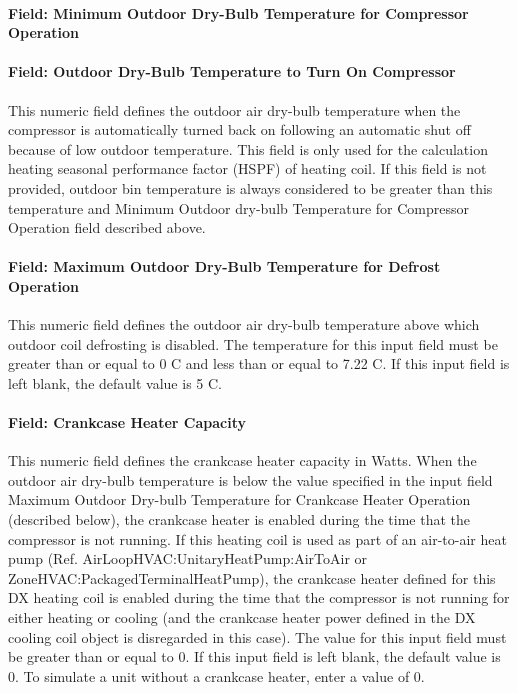 \paragraph{Field: Minimum Outdoor Dry-Bulb Temperature for Compressor Operation}\label{field-minimum-outdoor-dry-bulb-temperature-for-compressor-operation}


\paragraph{Field: Outdoor Dry-Bulb Temperature to Turn On Compressor}\label{field-outdoor-dry-bulb-temperature-to-turn-on-compressor}

This numeric field defines the outdoor air dry-bulb temperature when the compressor is automatically turned back on following an automatic shut off because of low outdoor temperature. This field is only used for the calculation heating seasonal performance factor (HSPF) of heating coil. If this field is not provided, outdoor bin temperature is always considered to be greater than this temperature and Minimum Outdoor dry-bulb Temperature for Compressor Operation field described above.

\paragraph{Field: Maximum Outdoor Dry-Bulb Temperature for Defrost Operation}\label{field-maximum-outdoor-dry-bulb-temperature-for-defrost-operation}

This numeric field defines the outdoor air dry-bulb temperature above which outdoor coil defrosting is disabled. The temperature for this input field must be greater than or equal to 0 C and less than or equal to 7.22 C. If this input field is left blank, the default value is 5 C.

\paragraph{Field: Crankcase Heater Capacity}\label{field-crankcase-heater-capacity-4}

This numeric field defines the crankcase heater capacity in Watts. When the outdoor air dry-bulb temperature is below the value specified in the input field Maximum Outdoor Dry-bulb Temperature for Crankcase Heater Operation (described below), the crankcase heater is enabled during the time that the compressor is not running. If this heating coil is used as part of an air-to-air heat pump (Ref. AirLoopHVAC:UnitaryHeatPump:AirToAir or ZoneHVAC:PackagedTerminalHeatPump), the crankcase heater defined for this DX heating coil is enabled during the time that the compressor is not running for either heating or cooling (and the crankcase heater power defined in the DX cooling coil object is disregarded in this case). The value for this input field must be greater than or equal to 0. If this input field is left blank, the default value is 0. To simulate a unit without a crankcase heater, enter a value of 0.

